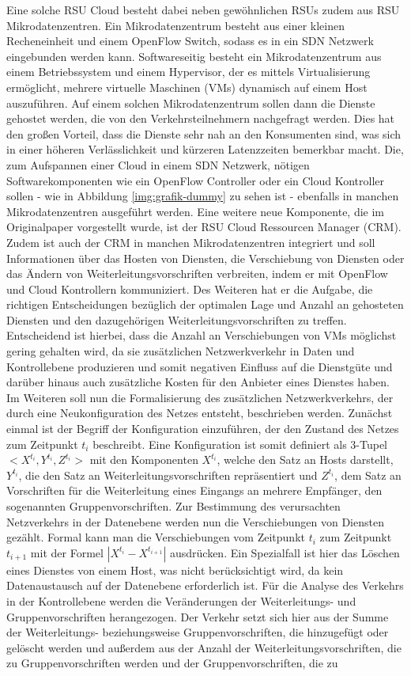 \documentclass[conference]{IEEEtran}
\begin{document}
Eine solche RSU Cloud besteht dabei neben gewöhnlichen RSUs zudem aus RSU Mikrodatenzentren. Ein Mikrodatenzentrum besteht aus einer kleinen Recheneinheit und einem OpenFlow Switch, sodass es in ein SDN Netzwerk eingebunden werden kann. Softwareseitig besteht ein Mikrodatenzentrum aus einem Betriebssystem und einem Hypervisor, der es mittels Virtualisierung ermöglicht, mehrere virtuelle Maschinen (VMs) dynamisch auf einem Host auszuführen. Auf einem solchen Mikrodatenzentrum sollen dann die Dienste gehostet werden, die von den Verkehrsteilnehmern nachgefragt werden. Dies hat den großen Vorteil, dass die Dienste sehr \glqq nah\grqq{} an den Konsumenten sind, was sich in einer höheren Verlässlichkeit und kürzeren Latenzzeiten bemerkbar macht. Die, zum Aufspannen einer Cloud in einem SDN Netzwerk, nötigen Softwarekomponenten wie ein OpenFlow Controller oder ein Cloud Kontroller sollen - wie in Abbildung \ref{img:grafik-dummy} zu sehen ist - ebenfalls in manchen Mikrodatenzentren ausgeführt werden. Eine weitere neue Komponente, die im Originalpaper vorgestellt wurde, ist der RSU Cloud Ressourcen Manager (CRM). Zudem ist auch der CRM in manchen Mikrodatenzentren integriert und soll Informationen über das Hosten von Diensten, die Verschiebung von Diensten oder das Ändern von Weiterleitungsvorschriften verbreiten, indem er mit OpenFlow und Cloud Kontrollern kommuniziert. Des Weiteren hat er die Aufgabe, die richtigen Entscheidungen bezüglich der optimalen Lage und Anzahl an gehosteten Diensten und den dazugehörigen Weiterleitungsvorschriften zu treffen. Entscheidend ist hierbei, dass die Anzahl an Verschiebungen von VMs möglichst gering gehalten wird, da sie zusätzlichen Netzwerkverkehr in Daten und Kontrollebene produzieren und somit negativen Einfluss auf die Dienstgüte und darüber hinaus auch zusätzliche Kosten für den Anbieter eines Dienstes haben. Im Weiteren soll nun die Formalisierung des zusätzlichen Netzwerkverkehrs, der durch eine Neukonfiguration des Netzes entsteht, beschrieben werden. Zunächst einmal ist der Begriff der Konfiguration einzuführen, der den Zustand des Netzes zum Zeitpunkt \(t_i\) beschreibt. Eine Konfiguration ist somit definiert als 3-Tupel \(<X^{t_i},Y^{t_i},Z^{t_i}>\) mit den Komponenten $X^{t_i}$, welche den Satz an Hosts darstellt, \(Y^{t_i}\), die den Satz an Weiterleitungsvorschriften repräsentiert und \(Z^{t_i}\),  dem Satz an Vorschriften für die Weiterleitung eines Eingangs an mehrere Empfänger, den sogenannten Gruppenvorschriften. Zur Bestimmung des verursachten Netzverkehrs in der Datenebene werden nun die Verschiebungen von Diensten gezählt. Formal kann man die Verschiebungen vom Zeitpunkt \(t_i\) zum Zeitpunkt \(t_{i+1}\) mit der Formel \(|X^{t_i}-X^{t_{i+1}}|\) ausdrücken. Ein Spezialfall ist hier das Löschen eines Dienstes von einem Host, was nicht berücksichtigt wird, da kein Datenaustausch auf der Datenebene erforderlich ist. Für die Analyse des Verkehrs in der Kontrollebene werden die Veränderungen der Weiterleitungs- und Gruppenvorschriften herangezogen. Der Verkehr setzt sich hier aus der Summe der Weiterleitungs- beziehungsweise Gruppenvorschriften, die hinzugefügt oder gelöscht werden und außerdem aus der Anzahl der Weiterleitungsvorschriften, die zu Gruppenvorschriften werden und der Gruppenvorschriften, die zu 
\end{document}
